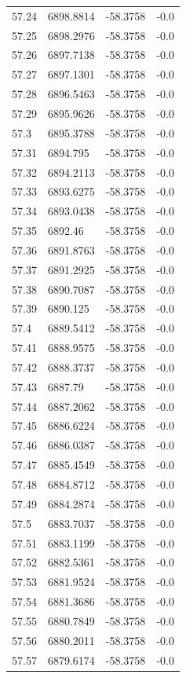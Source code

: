 \begin{table}[H]
\begin{tabular}{llll}
57.24 & 6898.8814 & -58.3758 & -0.0 \\
57.25 & 6898.2976 & -58.3758 & -0.0 \\
57.26 & 6897.7138 & -58.3758 & -0.0 \\
57.27 & 6897.1301 & -58.3758 & -0.0 \\
57.28 & 6896.5463 & -58.3758 & -0.0 \\
57.29 & 6895.9626 & -58.3758 & -0.0 \\
57.3 & 6895.3788 & -58.3758 & -0.0 \\
57.31 & 6894.795 & -58.3758 & -0.0 \\
57.32 & 6894.2113 & -58.3758 & -0.0 \\
57.33 & 6893.6275 & -58.3758 & -0.0 \\
57.34 & 6893.0438 & -58.3758 & -0.0 \\
57.35 & 6892.46 & -58.3758 & -0.0 \\
57.36 & 6891.8763 & -58.3758 & -0.0 \\
57.37 & 6891.2925 & -58.3758 & -0.0 \\
57.38 & 6890.7087 & -58.3758 & -0.0 \\
57.39 & 6890.125 & -58.3758 & -0.0 \\
57.4 & 6889.5412 & -58.3758 & -0.0 \\
57.41 & 6888.9575 & -58.3758 & -0.0 \\
57.42 & 6888.3737 & -58.3758 & -0.0 \\
57.43 & 6887.79 & -58.3758 & -0.0 \\
57.44 & 6887.2062 & -58.3758 & -0.0 \\
57.45 & 6886.6224 & -58.3758 & -0.0 \\
57.46 & 6886.0387 & -58.3758 & -0.0 \\
57.47 & 6885.4549 & -58.3758 & -0.0 \\
57.48 & 6884.8712 & -58.3758 & -0.0 \\
57.49 & 6884.2874 & -58.3758 & -0.0 \\
57.5 & 6883.7037 & -58.3758 & -0.0 \\
57.51 & 6883.1199 & -58.3758 & -0.0 \\
57.52 & 6882.5361 & -58.3758 & -0.0 \\
57.53 & 6881.9524 & -58.3758 & -0.0 \\
57.54 & 6881.3686 & -58.3758 & -0.0 \\
57.55 & 6880.7849 & -58.3758 & -0.0 \\
57.56 & 6880.2011 & -58.3758 & -0.0 \\
57.57 & 6879.6174 & -58.3758 & -0.0 \\

\end{tabular}
\end{table}
